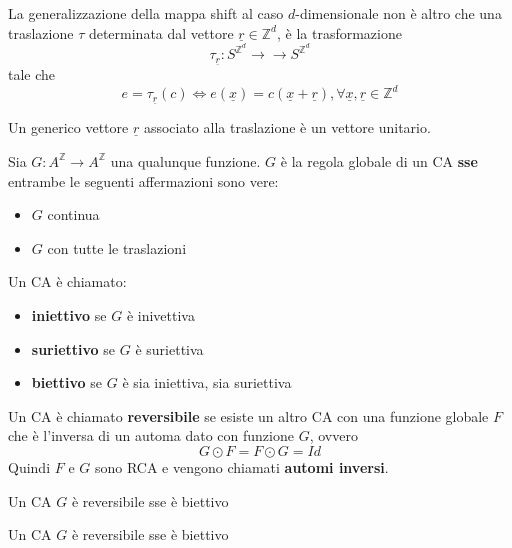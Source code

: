 La generalizzazione della mappa shift al caso $d$-dimensionale non è altro che una 
traslazione $\tau$ determinata dal vettore $\underline{r}\in  \mathbb{Z}^d$, è
la trasformazione
$$\tau_{\underline{r}} :  S^{\mathbb{Z}^d} \rightarrow \rightarrow S^{\mathbb{Z}^d}$$
tale che 
$$e =\tau_{\underline{r}}(c) \iff e(\underline{x}) =  c(\underline{x}+\underline{r}), \forall \underline{x},\underline{r}\in \mathbb{Z}^d$$

Un generico vettore $\underline{r}$ associato alla traslazione è un vettore 
unitario.

\begin{teorema}  
    Sia $G:A^\mathbb{Z}\rightarrow A^\mathbb{Z}$ una qualunque funzione.
    $G$ è la regola globale di un CA \textbf{sse} entrambe le seguenti affermazioni
    sono vere:
    \begin{itemize}
        \item $G$ continua
        \item $G$ con tutte le traslazioni
    \end{itemize}
\end{teorema}

\begin{definizione} 
    Un CA è chiamato:
    \begin{itemize}
        \item \textbf{iniettivo} se $G$ è inivettiva
        \item \textbf{suriettivo} se $G$ è suriettiva
        \item \textbf{biettivo} se $G$ è sia iniettiva, sia suriettiva
    \end{itemize}

\end{definizione}


\begin{definizione} 
    Un CA è chiamato \textbf{reversibile} se esiste un altro CA con una funzione 
    globale $F$ che è l'inversa di un automa dato con funzione $G$, ovvero
    $$ G\odot F= F\odot G = Id$$
    Quindi $F$ e $G$ sono RCA e vengono chiamati \textbf{automi inversi}.
\end{definizione}

\begin{teorema}
    Un CA $G$ è reversibile sse è biettivo
\end{teorema}
\begin{teorema}
    Un CA $G$ è reversibile sse è biettivo
\end{teorema}

